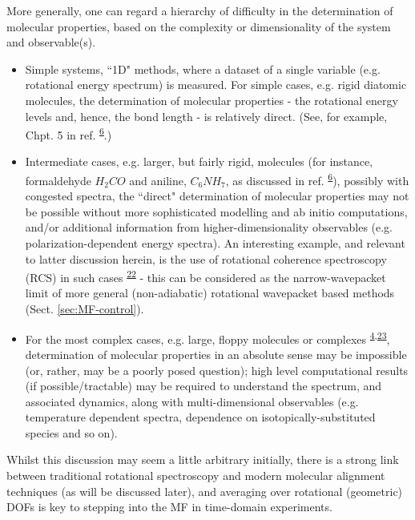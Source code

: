 \documentclass[10pt]{article}
\begin{document}

More generally, one can regard a hierarchy of difficulty in the determination of molecular properties, based on the complexity or dimensionality of the system and observable(s).
\begin{itemize}
\item Simple systems, ``1D" methods, where a dataset of a single variable (e.g. rotational energy spectrum) is measured. For simple cases, e.g. rigid diatomic molecules, the determination of molecular properties - the rotational energy levels and, hence, the bond length - is relatively direct. (See, for example, Chpt. 5 in ref. \textsuperscript{\hyperref[csl:6]{6}}.) %
\item Intermediate cases, e.g. larger, but fairly rigid, molecules (for instance, formaldehyde $H_2CO$ and aniline, $C_6NH_7$, as discussed in ref. \textsuperscript{\hyperref[csl:6]{6}}), possibly with congested spectra, the ``direct" determination of molecular properties may not be possible without more sophisticated modelling and ab initio computations, and/or additional information from higher-dimensionality observables (e.g. polarization-dependent energy spectra). An interesting example, and relevant to latter discussion herein, is the use of rotational coherence spectroscopy (RCS) in such cases \textsuperscript{\hyperref[csl:22]{22}} - this can be considered as the narrow-wavepacket limit of more general (non-adiabatic) rotational wavepacket based methods (Sect. \ref{sec:MF-control}).
\item For the most complex cases, e.g. large, floppy molecules or complexes \textsuperscript{\hyperref[csl:4]{4},\hyperref[csl:23]{23}}, determination of molecular properties in an absolute sense may be impossible (or, rather, may be a poorly posed question); high level computational results (if possible/tractable) may be required to understand the spectrum, and associated dynamics, along with multi-dimensional observables (e.g. temperature dependent spectra, dependence on isotopically-substituted species and so on).
\end{itemize}    

Whilst this discussion may seem a little arbitrary initially, there is a strong link between traditional rotational spectroscopy and modern molecular alignment techniques (as will be discussed later), and averaging over rotational (geometric) DOFs is key to stepping into the MF in time-domain experiments.
\end{document}
